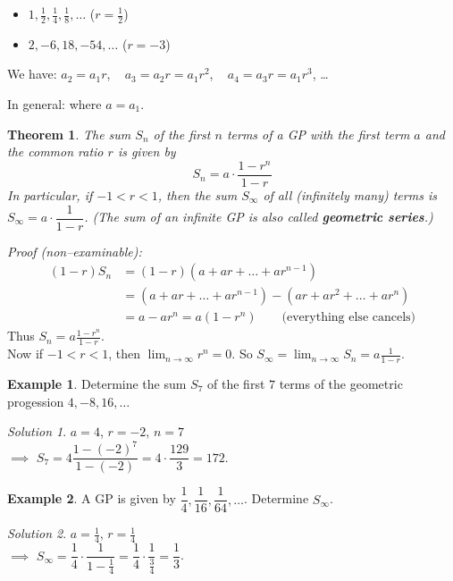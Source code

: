\documentclass[
  12pt,
  oneside]{book}
\providecommand{\tightlist}{%
  \setlength{\itemsep}{0pt}\setlength{\parskip}{0pt}}
\newtheorem{theorem}{Theorem}[chapter]
\theoremstyle{definition}
\theoremstyle{definition}
\newtheorem{example}{Example}[chapter]
\theoremstyle{definition}
\theoremstyle{definition}
\theoremstyle{remark}
\newtheorem*{solution}{Solution}
\begin{document}
\begin{itemize}
\tightlist
\item
  \(1,\frac12,\frac14,\frac18,\dots\) \quad (\(r=\frac12\))
\item
  \(2,-6,18,-54,\dots\) \quad (\(r=-3\))
\end{itemize}

We have: \(a_2=a_1r\), ~ \(a_3=a_2r = a_1r^2\), ~ \(a_4=a_3r=a_1r^3\), \dots

In general:  where \(a=a_1\).

\begin{theorem}
The sum \(S_n\) of the first \(n\) terms of a GP with the first
term \(a\) and the common ratio \(r\) is given by
\[
\boxed{S_n = a\cdot \frac{1-r^n}{1-r}}
\]
In particular, if \(-1<r<1\), then the sum \(S_\infty\) of all (infinitely many) terms is \(S_\infty = a\cdot\dfrac{1}{1-r}\). (The sum of an infinite GP is also called \textbf{geometric series}.)
\end{theorem}

\emph{Proof (non--examinable):}
\begin{align*}
    (1-r)S_n &= (1-r)(a+ar+\dots+ar^{n-1})\\
     &= (a+ar+\dots+ar^{n-1}) - (ar + ar^2 +\dots +ar^n) \\
     &= a-ar^n = a(1-r^n) \qquad\text{(everything else cancels)}
\end{align*}
Thus \(S_n = a\frac{1-r^n}{1-r}\).\\
Now if \(-1<r<1\), then \(\lim_{n\to\infty}r^n=0\). So \(S_\infty=\lim_{n\to\infty}S_n = a\frac{1}{1-r}\).

\begin{example}
Determine the sum \(S_7\) of the first \(7\) terms of the geometric progession \(4,-8,16,\dots\)
\end{example}

\begin{solution}
\(a=4\), \(r=-2\), \(n=7\)\\
\(\implies\) \(S_7=4\dfrac{1-(-2)^7}{1-(-2)}=4\cdot\dfrac{129}3 = 172\).
\end{solution}

\begin{example}
A GP is given by \(\dfrac14,\dfrac1{16},\dfrac1{64},\dots\). Determine \(S_\infty\).
\end{example}

\begin{solution}
\(a=\frac14\), \(r=\frac14\)\\
\(\implies\) \(S_\infty = \dfrac{1}{4}\cdot\dfrac{1}{1-\frac14}= \dfrac{1}{4}\cdot\dfrac{1}{\frac{3}{4}}=\dfrac{1}{3}\).
\end{solution}
\end{document}
